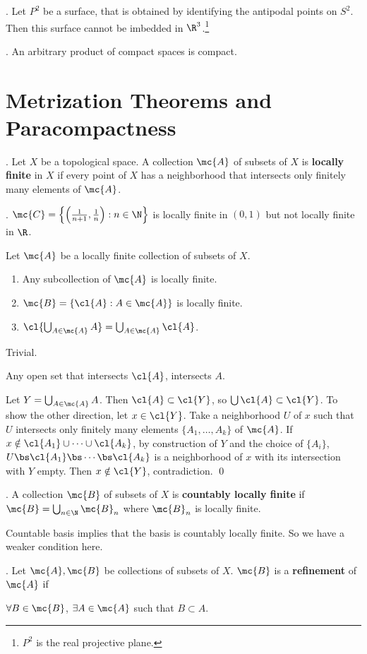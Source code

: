 \ex. Let \(P^2\) be a surface, that is obtained by identifying the antipodal points on \(S^2\). Then this surface cannot be imbedded in \(\R^3\).\footnote{\(P^2\) is the real projective plane.}


\thm. An arbitrary product of compact spaces is compact.

\setcounter{chapter}{5}
\chapter{Metrization Theorems and Paracompactness}

\setcounter{topic}{38}

.  Let \(X\) be a topological space. A collection \(\mc{A}\) of subsets of \(X\) is \textbf{locally finite} in \(X\) if every point of \(X\) has a neighborhood that intersects only finitely many elements of \(\mc{A}\).

\ex. \(\mc{C} = \left\{\left(\frac{1}{n+1}, \frac{1}{n}\right): n \in \N\right\}\) is locally finite in \((0, 1)\) but not locally finite in \(\R\).

 Let \(\mc{A}\) be a locally finite collection of subsets of \(X\).
\begin{enumerate}
    \item Any subcollection of \(\mc{A}\) is locally finite.
    \item \(\mc{B} = \{\cl{A}: A \in \mc{A}\}\) is locally finite.
    \item \(\cl{\bigcup_{A \in \mc{A}} A} = \bigcup_{A \in \mc{A}} \cl{A}\).
\end{enumerate}

\pf {} Trivial.

 Any open set that intersects \(\cl{A}\), intersects \(A\).

 Let \(Y = \bigcup_{A \in \mc{A}} A\). Then \(\cl{A} \subset \cl{Y}\), so \(\bigcup \cl{A} \subset \cl{Y}\). To show the other direction, let \(x \in \cl{Y}\). Take a neighborhood \(U\) of \(x\) such that \(U\) intersects only finitely many elements \(\{A_1, \dots, A_k\}\) of \(\mc{A}\). If \(x \notin \cl{A_1} \cup \cdots \cup \cl{A_k}\), by construction of \(Y\) and the choice of \(\{A_i\}\), \(U \bs \cl{A_1} \bs \cdots \bs \cl{A_k}\) is a neighborhood of \(x\) with its intersection with \(Y\) empty. Then \(x \notin \cl{Y}\), contradiction. \qed

.  A collection \(\mc{B}\) of subsets of \(X\) is \textbf{countably locally finite} if \(\mc{B} = \bigcup_{n\in \N} \mc{B}_n\) where \(\mc{B}_n\) is locally finite.

\rmk Countable basis implies that the basis is countably locally finite. So we have a weaker condition here.

.  Let \(\mc{A}, \mc{B}\) be collections of subsets of \(X\). \(\mc{B}\) is a \textbf{refinement} of \(\mc{A}\) if
\begin{center}
    \(\forall B \in \mc{B}\), \(\exists A \in \mc{A}\) such that \(B \subset A\).
\end{center}

\pagebreak
